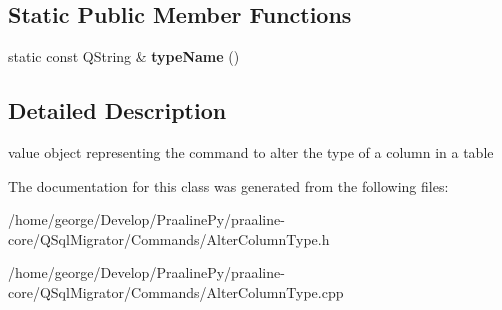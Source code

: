 \subsection*{Static Public Member Functions}
\begin{DoxyCompactItemize}
\item 
\mbox{\label{class_q_sql_migrator_1_1_commands_1_1_alter_column_type_a92f44cac5b0b3ba9dad1f6dd515e1886}} 
static const Q\+String \& {\bfseries type\+Name} ()
\end{DoxyCompactItemize}


\subsection{Detailed Description}
value object representing the command to alter the type of a column in a table 

The documentation for this class was generated from the following files\+:\begin{DoxyCompactItemize}
\item 
/home/george/\+Develop/\+Praaline\+Py/praaline-\/core/\+Q\+Sql\+Migrator/\+Commands/Alter\+Column\+Type.\+h\item 
/home/george/\+Develop/\+Praaline\+Py/praaline-\/core/\+Q\+Sql\+Migrator/\+Commands/Alter\+Column\+Type.\+cpp\end{DoxyCompactItemize}
